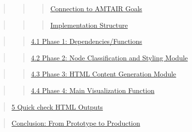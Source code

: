 \documentclass[
  11pt,
  letterpaper,
]{book}
\begin{document}
\begin{quote}
\begin{quote}
\begin{quote}
\hyperref[scrollTo=t3zl7vKMECMgux26uniqifier=1]{Connection to AMTAIR
Goals}
\end{quote}
\end{quote}
\end{quote}

\begin{quote}
\begin{quote}
\begin{quote}
\hyperref[scrollTo=t3zl7vKMECMgux26uniqifier=1]{Implementation
Structure}
\end{quote}
\end{quote}
\end{quote}

\begin{quote}
\begin{quote}
\hyperref[scrollTo=LSeSAPvtgIgUux26uniqifier=1]{4.1 Phase 1:
Dependencies/Functions}
\end{quote}
\end{quote}

\begin{quote}
\begin{quote}
\hyperref[scrollTo=byAExfek5yFUux26uniqifier=1]{4.2 Phase 2: Node
Classification and Styling Module}
\end{quote}
\end{quote}

\begin{quote}
\begin{quote}
\hyperref[scrollTo=gnS3jFGU52OZux26uniqifier=1]{4.3 Phase 3: HTML
Content Generation Module}
\end{quote}
\end{quote}

\begin{quote}
\begin{quote}
\hyperref[scrollTo=d2uyG0Pi571fux26uniqifier=1]{4.4 Phase 4: Main
Visualization Function}
\end{quote}
\end{quote}

\begin{quote}
\hyperref[scrollTo=pLShDqDXbzJxux26uniqifier=1]{5 Quick check HTML
Outputs}
\end{quote}

\begin{quote}
\hyperref[scrollTo=oatKYlKrOSiNux26uniqifier=1]{Conclusion: From
Prototype to Production}
\end{quote}
\end{document}
